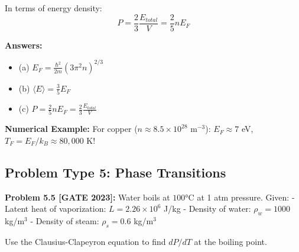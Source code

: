\documentclass[12pt,a4paper]{article}
\begin{document}
\begin{solution}
In terms of energy density:
$$P = \frac{2}{3}\frac{E_{total}}{V} = \frac{2}{5}nE_F$$

\textbf{Answers:}
\begin{itemize}
    \item (a) $E_F = \frac{\hbar^2}{2m}(3\pi^2 n)^{2/3}$
    \item (b) $\langle E \rangle = \frac{3}{5}E_F$
    \item (c) $P = \frac{2}{5}nE_F = \frac{2}{3}\frac{E_{total}}{V}$
\end{itemize}

\textbf{Numerical Example:} For copper ($n \approx 8.5 \times 10^{28}$ m$^{-3}$):
$E_F \approx 7$ eV, $T_F = E_F/k_B \approx 80,000$ K!
\end{solution}

\subsection{Problem Type 5: Phase Transitions}

\textbf{Problem 5.5 [GATE 2023]:} Water boils at $100°$C at 1 atm pressure. Given:
- Latent heat of vaporization: $L = 2.26 \times 10^6$ J/kg
- Density of water: $\rho_w = 1000$ kg/m$^3$
- Density of steam: $\rho_s = 0.6$ kg/m$^3$

Use the Clausius-Clapeyron equation to find $dP/dT$ at the boiling point.
\end{document}
